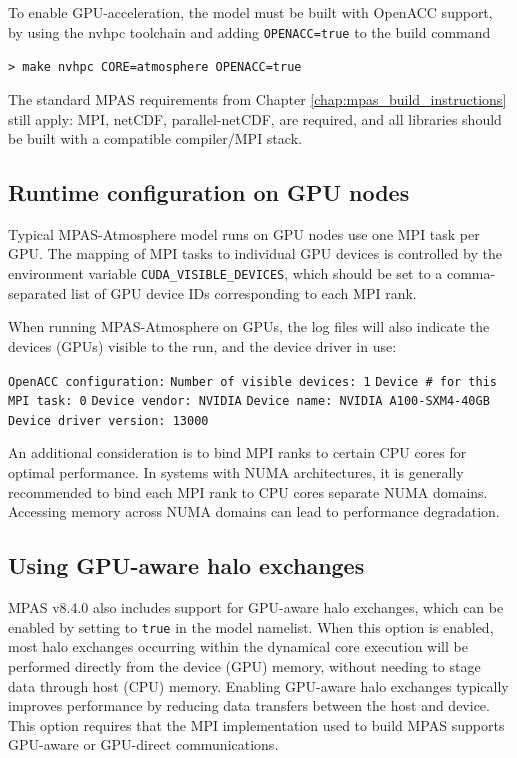 To enable GPU-acceleration, the model must be built with OpenACC support, by using the nvhpc toolchain and adding {\tt OPENACC=true} to the build command

\vspace{12pt}
{\tt > make nvhpc CORE=atmosphere OPENACC=true}
\vspace{12pt}

The standard MPAS requirements from Chapter \ref{chap:mpas_build_instructions} still apply: MPI, netCDF, parallel-netCDF, are required, and all libraries should be built with a compatible compiler/MPI stack.

\subsection{Runtime configuration on GPU nodes}

Typical MPAS-Atmosphere model runs on GPU nodes use one MPI task per GPU. The mapping of MPI tasks to individual GPU devices
is controlled by the environment variable {\tt CUDA\_VISIBLE\_DEVICES}, which should be set to a comma-separated list of GPU device IDs corresponding to each MPI rank.

When running MPAS-Atmosphere on GPUs, the log files will also indicate the devices (GPUs) visible to the run, and the device driver in use:

\vspace{12pt}
\noindent
{\tt OpenACC configuration:} \newline
{\tt   Number of visible devices: 1} \newline
{\tt   Device \# for this MPI task: 0} \newline
{\tt   Device vendor: NVIDIA} \newline
{\tt   Device name: NVIDIA A100-SXM4-40GB} \newline
{\tt   Device driver version: 13000} \newline
\vspace{12pt}


An additional consideration is to bind MPI ranks to certain CPU cores for optimal performance. In systems with NUMA architectures,
it is generally recommended to bind each MPI rank to CPU cores separate NUMA domains. Accessing memory across NUMA domains can lead to performance degradation.


\subsection{Using GPU-aware halo exchanges}
MPAS v8.4.0 also includes support for GPU-aware halo exchanges, which can be enabled by setting  to {\tt true} in the model namelist.
When this option is enabled, most halo exchanges occurring within the dynamical core execution will be performed directly from the device (GPU) memory,
without needing to stage data through host (CPU) memory. Enabling GPU-aware halo exchanges typically improves performance by reducing data transfers between the host and device. 
This option requires that the MPI implementation used to build MPAS supports GPU-aware or GPU-direct communications.


